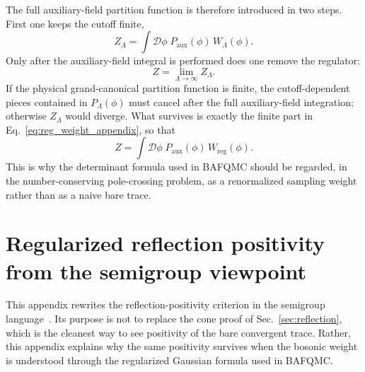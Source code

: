 \documentclass[twocolumn,aps,prb,10pt,amsmath,amssymb,amsthm,superscriptaddress]{revtex4-2}
\newcommand{\mc}[1]{\mathcal{#1}}
\theoremstyle{remark}
\begin{document}
The full auxiliary-field partition function is therefore introduced in two steps. First one keeps the cutoff finite,
\begin{equation}
    Z_{\Lambda}
    = \int \mc D\phi\; P_{\mathrm{aux}}(\phi)\,W_{\Lambda}(\phi).
\end{equation}
Only after the auxiliary-field integral is performed does one remove the regulator:
\begin{equation}
    Z = \lim_{\Lambda\to\infty} Z_{\Lambda}.
\end{equation}
If the physical grand-canonical partition function is finite, the cutoff-dependent pieces contained in $P_{\Lambda}(\phi)$ must cancel after the full auxiliary-field integration; otherwise $Z_{\Lambda}$ would diverge. What survives is exactly the finite part in Eq.~\eqref{eq:reg_weight_appendix}, so that 
\begin{equation}
    Z
    = \int \mc D\phi\; P_{\mathrm{aux}}(\phi)\,W_{\mathrm{reg}}(\phi).
\end{equation}
This is why the determinant formula used in BAFQMC should be regarded, in the number-conserving pole-crossing problem, as a renormalized sampling weight rather than as a naive bare trace.


\section{Regularized reflection positivity from the semigroup viewpoint}
\label{app:regularized_rp}

This appendix rewrites the reflection-positivity criterion in the semigroup language~\cite{wei2024prb}. Its purpose is not to replace the cone proof of Sec.~\ref{sec:reflection}, which is the cleanest way to see positivity of the bare convergent trace. Rather, this appendix explains why the same positivity survives when the bosonic weight is understood through the regularized Gaussian formula used in BAFQMC.
\end{document}
